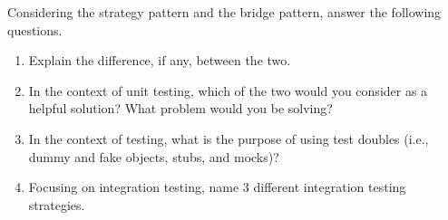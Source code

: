 Considering the strategy pattern and the bridge pattern, answer the
following questions.

\begin{enumerate}
    \item {} Explain the difference, if any, between the two.
        \newline\answer\questionFourAnswerA
    \item {} In the context of unit testing, which of the two would you consider as a helpful solution? What problem would you be solving?
        \newline\answer\questionFourAnswerB
    \item {} In the context of testing, what is the purpose of using test doubles (i.e., dummy and fake objects, stubs, and mocks)?
        \newline\answer\questionFourAnswerC
    \item {} Focusing on integration testing, name 3 different integration testing strategies. 
        \newline\answer\questionFourAnswerD
\end{enumerate}